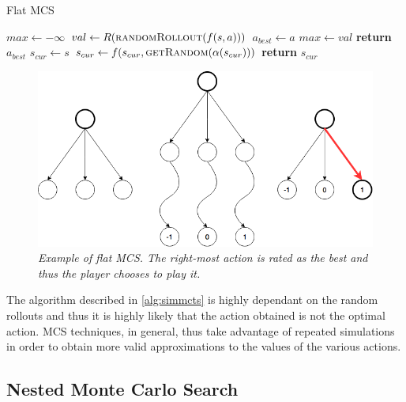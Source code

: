 \documentclass[master.tex]{subfiles}
\begin{document}
\begin{algorithm}
\caption{Flat MCS}
\label{alg:simmcts}
\begin{algorithmic}[1]
\State $max \gets -\infty$
	\State $val \gets R(\textsc{randomRollout}(f(s, a)))$
		\State $a_{best} \gets a$
		\State $max \gets val$
	\EndIf
\EndFor
\State \textbf{return} $a_{best}$
\EndProcedure
{}
\State $s_{cur} \gets s$
	\State $s_{cur} \gets f(s_{cur}, \textsc{getRandom}(\alpha(s_{cur})))$
\EndWhile
\State \textbf{return} $s_{cur}$
\EndProcedure
\end{algorithmic}
\end{algorithm}

\begin{figure}[h!]
\centering

\includegraphics[width=\textwidth]{images/simpleMCTS.png}
\caption{\emph{Example of flat MCS. The right-most action is rated as the best and thus the player chooses to play it.}}
\label{fig:simplemcts}
\end{figure}

The algorithm described in \ref{alg:simmcts} is highly dependant on the random rollouts and thus it is highly likely that the action obtained is not the optimal action. MCS techniques, in general, thus take advantage of repeated simulations in order to obtain more valid approximations to the values of the various actions. 

\subsection{Nested Monte Carlo Search}
\end{document}
